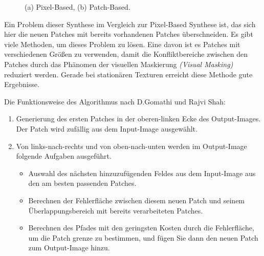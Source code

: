 \documentclass[12pt, a4paper,twoside,openright]{report} %
\begin{document}
\begin{figure}[H]
    \centering
    \qquad
    \caption{(a) Pixel-Based, (b) Patch-Based.}%
\end{figure}

Ein Problem dieser Synthese im Vergleich zur Pixel-Based Synthese ist, das sich hier die neuen Patches mit bereits vorhandenen Patches überschneiden.
Es gibt viele Methoden, um dieses Problem zu lösen.
Eine davon ist es Patches mit verschiedenen Größen zu verwenden, damit die Konfliktbereiche zwischen den Patches durch das Phänomen der visuellen Maskierung
\textit{(Visual Masking)} reduziert werden.
Gerade bei stationären Texturen erreicht diese Methode gute Ergebnisse. \cite{EfrosQuilt}

Die Funktionsweise des Algorithmus nach D.Gomathi und Rajvi Shah:

\begin{enumerate}
    \item Generierung des ersten Patches in der oberen-linken Ecke des Output-Images. Der Patch wird zufällig aus dem Input-Image ausgewählt.
    \item Von links-nach-rechts und von oben-nach-unten werden im Output-Image folgende Aufgaben ausgeführt.
    \begin{itemize}
        \item Auswahl des nächsten hinzuzufügenden Feldes aus dem Input-Image aus den am besten passenden Patches.
        \item Berechnen der Fehlerfläche zwischen diesem neuen Patch und seinem Überlappungsbereich mit bereits
        verarbeiteten Patches.
        \item Berechnen des Pfades mit den geringsten Kosten durch die Fehlerfläche, um die Patch grenze zu bestimmen, und fügen Sie dann den neuen Patch zum Output-Image hinzu.
    \end{itemize}
\end{enumerate}
\end{document}
